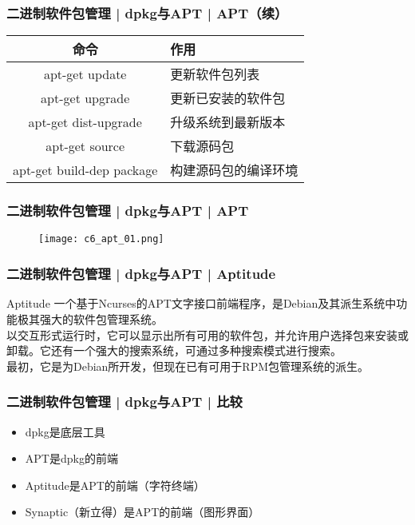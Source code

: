 \begin{frame}[fragile]
  \frametitle{二进制软件包管理 | dpkg与APT | \alert{APT（续）}}
  \begin{table}
    \centering
    \begin{tabularx}{\textwidth}{cX}
      \hline
      \rowcolor{blue!50}命令 & 作用\\
      \hline
      apt-get update & 更新软件包列表\\
      apt-get upgrade & 更新已安装的软件包\\
      apt-get dist-upgrade & 升级系统到最新版本\\
      apt-get source & 下载源码包\\
      apt-get build-dep package & 构建源码包的编译环境\\
      \hline
    \end{tabularx}
  \end{table}
\end{frame}

\begin{frame}
  \frametitle{二进制软件包管理 | dpkg与APT | APT}
  \begin{figure}
    \centering
    \texttt{[image: c6\_apt\_01.png]}
  \end{figure}
\end{frame}

\begin{frame}
  \frametitle{二进制软件包管理 | dpkg与APT | Aptitude}
  \begin{block}{Aptitude}
    一个基于Ncurses的APT文字接口前端程序，是Debian及其派生系统中功能极其强大的软件包管理系统。\\
     \vspace{5pt}
    以交互形式运行时，它可以显示出所有可用的软件包，并允许用户选择包来安装或卸载。它还有一个强大的搜索系统，可通过多种搜索模式进行搜索。\\
     \vspace{5pt}
    最初，它是为Debian所开发，但现在已有可用于RPM包管理系统的派生。
  \end{block}
\end{frame}

\begin{frame}
  \frametitle{二进制软件包管理 | dpkg与APT | 比较}
  \begin{itemize}
    \item dpkg是底层工具
    \item APT是dpkg的前端
    \item Aptitude是APT的前端（字符终端）
    \item Synaptic（新立得）是APT的前端（图形界面）
  \end{itemize}
\end{frame}


